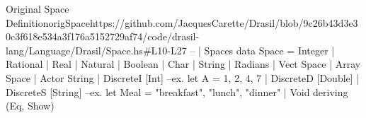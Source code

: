 \begin{haskell}{Original Space Definition}{origSpace}{https://github.com/JacquesCarette/Drasil/blob/9c26b43d3e30c3f618e534a3f176a5152729af74/code/drasil-lang/Language/Drasil/Space.hs\#L10-L27}
-- | Spaces
data Space =
    Integer
  | Rational
  | Real
  | Natural
  | Boolean
  | Char
  | String
  | Radians
  | Vect Space
  | Array Space
  | Actor String
  | DiscreteI [Int]  --ex. let A = {1, 2, 4, 7}
  | DiscreteD [Double]
  | DiscreteS [String] --ex. let Meal = {"breakfast", "lunch", "dinner"}
  | Void
  deriving (Eq, Show)
\end{haskell}
